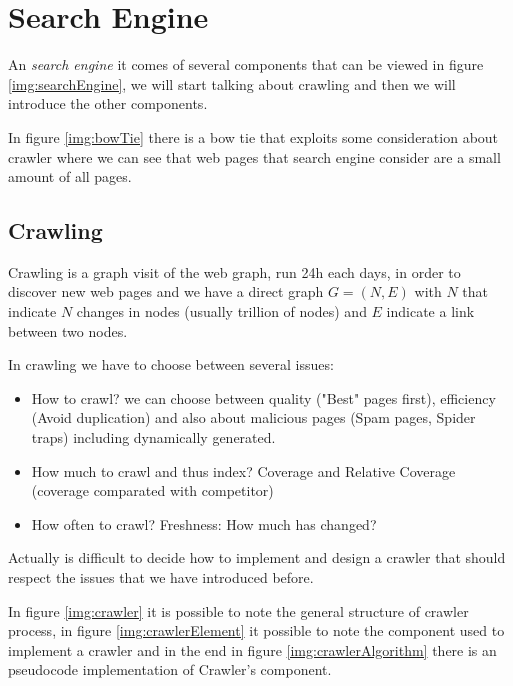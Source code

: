 \chapter{Search Engine}
An \emph{search engine} it comes of several components that can be viewed in figure \ref{img:searchEngine},
we will start talking about crawling and then we will introduce the other components.

In figure \ref{img:bowTie} there is a bow tie that exploits some consideration about crawler where
we can see that web pages that search engine consider are a small amount of all pages. 

\section{Crawling}
Crawling is a graph visit of the web graph, run 24h each days, in order to discover new web pages and we 
have a direct graph $G = (N, E)$ with $N$ that indicate $N$ changes in nodes (usually trillion of nodes) and
$E$ indicate a link between two nodes.

In crawling we have to choose between several issues:
\begin{itemize}
    \item How to crawl? we can choose between quality ("Best" pages first), efficiency (Avoid duplication) and also 
          about malicious pages (Spam pages, Spider traps) including dynamically generated.
    \item How much to crawl and thus index? Coverage and Relative Coverage (coverage comparated with competitor)
    \item How often to crawl? Freshness: How much has changed?
\end{itemize}
Actually is difficult to decide how to implement and design a crawler that should respect the issues that we have
introduced before.

In figure \ref{img:crawler} it is possible to note the general structure of crawler process, in figure \ref{img:crawlerElement} it 
possible to note the component used to implement a crawler and in the end in figure \ref{img:crawlerAlgorithm} there is an pseudocode 
implementation of Crawler's component.

